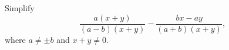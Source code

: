 Simplify
\[
\dfrac{a(x+y)}{(a-b)(x+y)}-\dfrac{bx-ay}{(a+b)(x+y)},
\]
where $a\ne\pm b$ and $x+y\ne0$.
